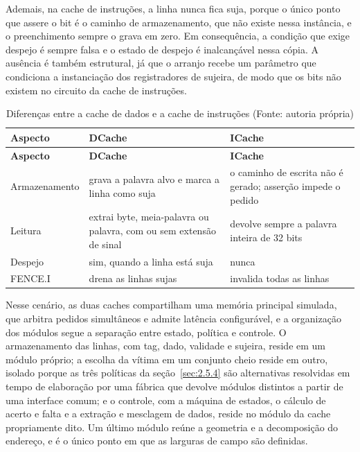 Ademais, na cache de instruções, a linha nunca fica suja, porque o único ponto que assere o bit é o caminho de armazenamento, que não existe nessa instância, e o preenchimento sempre o grava em zero. Em consequência, a condição que exige despejo é sempre falsa e o estado de despejo é inalcançável nessa cópia. A ausência é também estrutural, já que o arranjo recebe um parâmetro que condiciona a instanciação dos registradores de sujeira, de modo que os bits não existem no circuito da cache de instruções.

{\small
\begin{longtable}{@{}>{\raggedright\arraybackslash}p{}>{\raggedright\arraybackslash}p{}>{\raggedright\arraybackslash}p{}@{}}
\caption[Diferenças entre a cache de dados e a cache de instruções]{Diferenças entre a cache de dados e a cache de instruções (Fonte: autoria própria)}\label{tab:3.1}\\
\hline
\textbf{Aspecto} & \textbf{DCache} & \textbf{ICache} \\
\hline
\endfirsthead
\hline
\textbf{Aspecto} & \textbf{DCache} & \textbf{ICache} \\
\hline
\endhead
\hline
\endlastfoot
Armazenamento & grava a palavra alvo e marca a linha como suja & o caminho de escrita não é gerado; asserção impede o pedido \\
Leitura & extrai byte, meia-palavra ou palavra, com ou sem extensão de sinal & devolve sempre a palavra inteira de 32 bits \\
Despejo & sim, quando a linha está suja & nunca \\
FENCE.I & drena as linhas sujas & invalida todas as linhas \\
\end{longtable}
}

Nesse cenário, as duas caches compartilham uma memória principal simulada, que arbitra pedidos simultâneos e admite latência configurável, e a organização dos módulos segue a separação entre estado, política e controle. O armazenamento das linhas, com tag, dado, validade e sujeira, reside em um módulo próprio; a escolha da vítima em um conjunto cheio reside em outro, isolado porque as três políticas da seção~\ref{sec:2.5.4} são alternativas resolvidas em tempo de elaboração por uma fábrica que devolve módulos distintos a partir de uma interface comum; e o controle, com a máquina de estados, o cálculo de acerto e falta e a extração e mesclagem de dados, reside no módulo da cache propriamente dito. Um último módulo reúne a geometria e a decomposição do endereço, e é o único ponto em que as larguras de campo são definidas.

